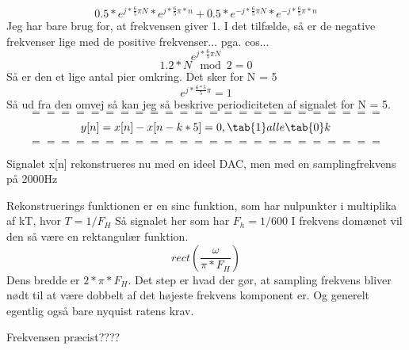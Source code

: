 \begin{rubrik}[Eksamenssæt2022]
\begin{eksamensOpgave}
\begin{UnderOpgave}
            \[0.5 * e^{j * \frac{6}{5}\pi N } * e^{j * \frac{6}{5}\pi * n} + 0.5 * e^{-j * \frac{6}{5}\pi N } * e^{-j * \frac{6}{5}\pi * n}\]
            Jeg har bare brug for, at frekvensen giver 1. I det tilfælde, så er de negative frekvenser lige med de positive frekvenser... pga. cos... 
            \[e^{j * \frac{6}{5}\pi N }\] 
            \[1.2 * N \mod 2 = 0\]
            Så er den et lige antal pier omkring.
            Det sker for N = 5
            \[e^{j * \frac{6 * 5}{5}\pi} = 1\]
            Så ud fra den omvej så kan jeg så beskrive periodiciteten af signalet for N = 5. 
            \[========================\]
            \[y[n] = x[n] - x[n - k * 5] = 0, \tab{1} alle \tab{0} k \]
            \[========================\]
        \end{UnderOpgave}
        Signalet x[n] rekonstrueres nu med en ideel DAC, men med en samplingfrekvens på 2000Hz
        \begin{UnderOpgave}
            Rekonstruerings funktionen er en sinc funktion, som har nulpunkter i multiplika af kT, hvor $T = 1/F_H$
            Så signalet her som har $F_h = 1/600$
            I frekvens domænet vil den så være en rektangulær funktion. 
            \[rect(\frac{\omega}{\pi * F_H})\]
            Dens bredde er $2 * \pi * F_H$. Det step er hvad der gør, at sampling frekvens bliver nødt til at være dobbelt af det højeste frekvens komponent er. 
            Og generelt egentlig også bare nyquist ratens krav.

            Frekvensen præcist???? 
            

\end{UnderOpgave}
\end{eksamensOpgave}
\end{rubrik}
